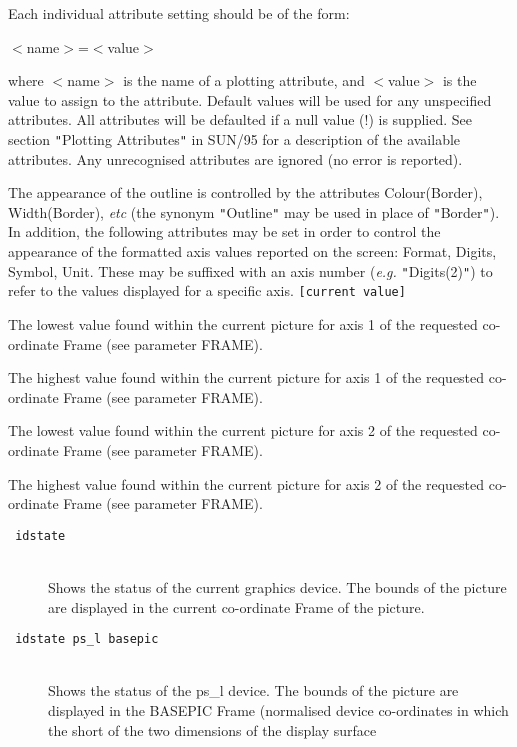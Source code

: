 \documentclass[twoside,11pt]{article}
\newcommand{\htmlref}[2]{#1}
\newcommand{\sstexamples}[1]{
   \goodbreak
   \item[Examples:] \mbox{} \\
   \vspace{-3.5ex}
   \begin{description}
      #1
   \end{description}
}
\newcommand{\sstsubsection}[1]{ \item[{#1}] \mbox{} \\}
\newcommand{\sstexamplesubsection}[2]{\sloppy \item{\ssttt #1} \mbox{} \\ #2 }
\newcommand{\ssttt}{\tt}
\renewcommand{\sstexamples}[1]{
      \htmlref{\item[Examples:]}{ap:example}
      \begin{description}
         #1
      \end{description}
   }
\renewcommand{\sstsubsection}[1]{\item[{#1}]}
\renewcommand{\sstexamplesubsection}[2]{\item[{\ssttt #1}] \\ #2}
\begin{document}
{{{         Each individual attribute setting should be of the form:

            $<$name$>$=$<$value$>$

         where $<$name$>$ is the name of a plotting attribute, and $<$value$>$ is
         the value to assign to the attribute. Default values will be
         used for any unspecified attributes. All attributes will be
         defaulted if a null value (!) is supplied. See section {\tt "}Plotting
         Attributes{\tt "} in SUN/95 for a description of the available
         attributes. Any unrecognised attributes are ignored (no error is
         reported).

         The appearance of the outline is controlled by the attributes
         Colour(Border), Width(Border), \emph{etc} (the synonym {\tt "}Outline{\tt "} may be
         used in place of {\tt "}Border{\tt "}). In addition, the following attributes
         may be set in order to control the appearance of the formatted axis
         values reported on the screen: Format, Digits, Symbol, Unit. These
         may be suffixed with an axis number (\emph{e.g.} {\tt "}Digits(2){\tt "}) to refer to
         the values displayed for a specific axis. {\tt [current value]}
      }
      \sstsubsection{
         X1 = LITERAL (Write)
      }{
         The lowest value found within the current picture for axis 1 of the
         requested co-ordinate Frame (see parameter FRAME).
      }
      \sstsubsection{
         X2 = LITERAL (Write)
      }{
         The highest value found within the current picture for axis 1 of the
         requested co-ordinate Frame (see parameter FRAME).
      }
      \sstsubsection{
         Y1 = LITERAL (Write)
      }{
         The lowest value found within the current picture for axis 2 of the
         requested co-ordinate Frame (see parameter FRAME).
      }
      \sstsubsection{
         Y2 = LITERAL (Write)
      }{
         The highest value found within the current picture for axis 2 of the
         requested co-ordinate Frame (see parameter FRAME).
      }
   }
   \sstexamples{
      \sstexamplesubsection{
         idstate
      }{
         Shows the status of the current graphics device. The bounds of
         the picture are displayed in the current co-ordinate Frame of
         the picture.
      }
      \sstexamplesubsection{
         idstate ps\_l basepic
      }{
         Shows the status of the ps\_l device. The bounds of the picture
         are displayed in the BASEPIC Frame (normalised device co-ordinates
         in which the short of the two dimensions of the display surface
}}}
\end{document}
